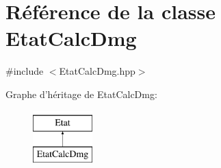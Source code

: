 \hypertarget{class_etat_calc_dmg}{\section{Référence de la classe Etat\-Calc\-Dmg}
\label{class_etat_calc_dmg}
}


{\ttfamily \#include $<$Etat\-Calc\-Dmg.\-hpp$>$}

Graphe d'héritage de Etat\-Calc\-Dmg\-:\begin{figure}[H]
\begin{center}
\leavevmode
\includegraphics[height=2.000000cm]{class_etat_calc_dmg}
\end{center}
\end{figure}
